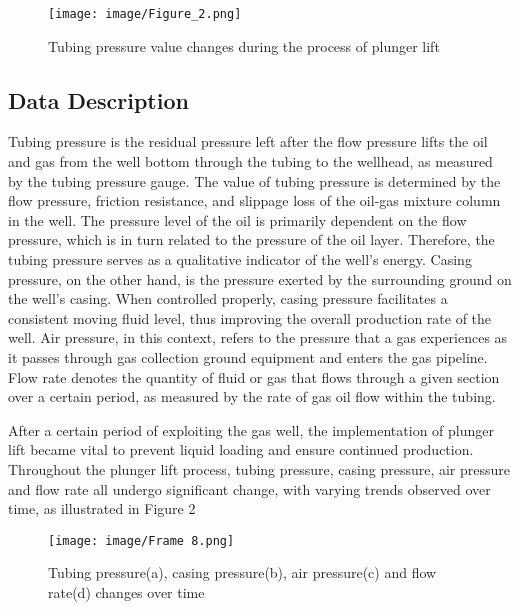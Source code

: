 \documentclass[sn-mathphys,Numbered]{sn-jnl}%
\theoremstyle{thmstyleone}%
\theoremstyle{thmstyletwo}%
\theoremstyle{thmstylethree}%
\begin{document}
\begin{figure}[htp]
    \centering
    \texttt{[image: image/Figure\_2.png]}
    \caption{\centering Tubing pressure value changes during the process of plunger lift}
    \label{fig:tubing pressure}
\end{figure}

\subsection{Data Description}\label{subsec2}

Tubing pressure is the residual pressure left after the flow pressure lifts the oil and gas from the well bottom through the tubing to the wellhead, as measured by the tubing pressure gauge. The value of tubing pressure is determined by the flow pressure, friction resistance, and slippage loss of the oil-gas mixture column in the well. The pressure level of the oil is primarily dependent on the flow pressure, which is in turn related to the pressure of the oil layer. Therefore, the tubing pressure serves as a qualitative indicator of the well's energy. Casing pressure, on the other hand, is the pressure exerted by the surrounding ground on the well's casing. When controlled properly, casing pressure facilitates a consistent moving fluid level, thus improving the overall production rate of the well. Air pressure, in this context, refers to the pressure that a gas experiences as it passes through gas collection ground equipment and enters the gas pipeline. Flow rate denotes the quantity of fluid or gas that flows through a given section over a certain period, as measured by the rate of gas oil flow within the tubing. 

After a certain period of exploiting the gas well, the implementation of plunger lift became vital to prevent liquid loading and ensure continued production. Throughout the plunger lift process, tubing pressure, casing pressure, air pressure and flow rate all undergo significant change, with varying trends observed over time, as illustrated in Figure 2

\begin{figure}[htp]
    \centering
    \texttt{[image: image/Frame 8.png]}
    \caption{\centering Tubing pressure(a), casing pressure(b), air pressure(c) and flow rate(d) changes over time}
    \label{fig:four}
\end{figure}
\end{document}
